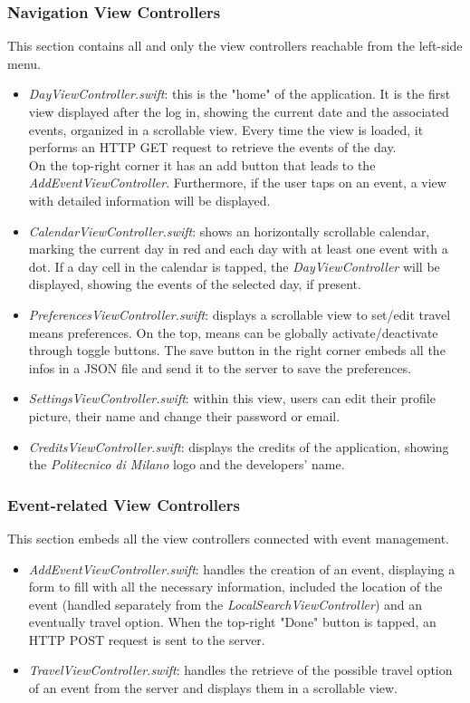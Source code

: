 \subsubsection*{Navigation View Controllers}
This section contains all and only the view controllers reachable from the left-side menu.
\begin{itemize}
	\item \textit{DayViewController.swift}: this is the "home" of the application. It is the first view displayed after the log in, showing the current date and the associated events, organized in a scrollable view. Every time the view is loaded, it performs an HTTP GET request to retrieve the events of the day.\\
	On the top-right corner it has an add button that leads to the \textit{AddEventViewController}. Furthermore, if the user taps on an event, a view with detailed information will be displayed.
	\item \textit{CalendarViewController.swift}: shows an horizontally scrollable calendar, marking the current day in red and each day with at least one event with a dot. If a day cell in the calendar is tapped, the \textit{DayViewController} will be displayed, showing the events of the selected day, if present.
	\item \textit{PreferencesViewController.swift}: displays a scrollable view to set/edit travel means preferences. On the top, means can be globally activate/deactivate through toggle buttons.
	The save button in the right corner embeds all the infos in a JSON file and send it to the server to save the preferences.
	\item \textit{SettingsViewController.swift}: within this view, users can edit their profile picture, their name and change their password or email.
	\item \textit{CreditsViewController.swift}: displays the credits of the application, showing the \textit{Politecnico di Milano} logo and the developers' name.
\end{itemize}

\subsubsection*{Event-related View Controllers}
This section embeds all the view controllers connected with event management.
\begin{itemize}
	\item \textit{AddEventViewController.swift}: handles the creation of an event, displaying a form to fill with all the necessary information, included the location of the event (handled separately from the \textit{LocalSearchViewController}) and an eventually travel option.
	When the top-right "Done" button is tapped, an HTTP POST request is sent to the server.
	\item \textit{TravelViewController.swift}: handles the retrieve of the possible travel option of an event from the server and displays them in a scrollable view.
\end{itemize}

